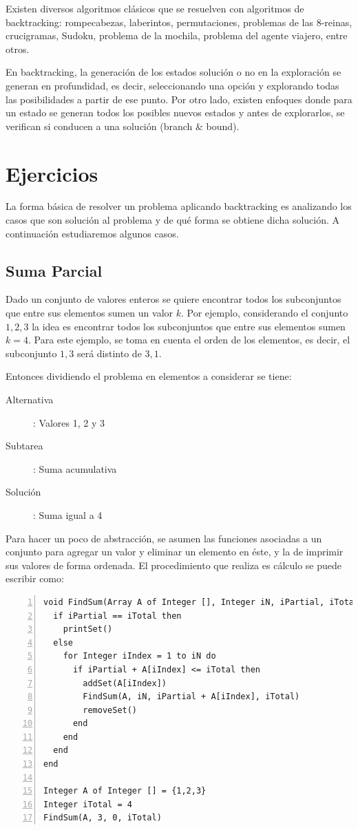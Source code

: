 Existen diversos algoritmos clásicos que se resuelven con algoritmos de backtracking: rompecabezas, laberintos, permutaciones, problemas de las 8-reinas, crucigramas, Sudoku, problema de la mochila, problema del agente viajero, entre otros. 

En backtracking, la generación de los estados solución o no en la exploración se generan en profundidad, es decir, seleccionando una opción y explorando todas las posibilidades a partir de ese punto. Por otro lado, existen enfoques donde para un estado se generan todos los posibles nuevos estados y antes de explorarlos, se verifican si conducen a una solución (branch \& bound).

\section{Ejercicios}

La forma básica de resolver un problema aplicando backtracking es analizando los casos que son solución al problema y de qué forma se obtiene dicha solución. A continuación estudiaremos algunos casos.

\subsection{Suma Parcial}
Dado un conjunto de valores enteros se quiere encontrar todos los subconjuntos que entre sus elementos sumen un valor $k$. Por ejemplo, considerando el conjunto ${1, 2, 3}$ la idea es encontrar todos los subconjuntos que entre sus elementos sumen $k=4$. Para este ejemplo, se toma en cuenta el orden de los elementos, es decir, el subconjunto ${1, 3}$ será distinto de ${3, 1}$.

Entonces dividiendo el problema en elementos a considerar se tiene:
\begin{description}
\item [Alternativa]: Valores 1, 2 y 3
\item [Subtarea]: Suma acumulativa
\item [Solución]: Suma igual a 4
\end{description}

Para hacer un poco de abstracción, se asumen las funciones asociadas a un conjunto para agregar un valor y eliminar un elemento en éste, y la de imprimir sus valores de forma ordenada. El procedimiento que realiza es cálculo se puede escribir como:

\begin{lstlisting}[upquote=true, language=pseudo, numbers=left]
void FindSum(Array A of Integer [], Integer iN, iPartial, iTotal)
  if iPartial == iTotal then
    printSet()
  else
    for Integer iIndex = 1 to iN do
      if iPartial + A[iIndex] <= iTotal then
        addSet(A[iIndex])
        FindSum(A, iN, iPartial + A[iIndex], iTotal)
        removeSet()
      end
    end
  end
end

Integer A of Integer [] = {1,2,3}
Integer iTotal = 4
FindSum(A, 3, 0, iTotal)
\end{lstlisting}


